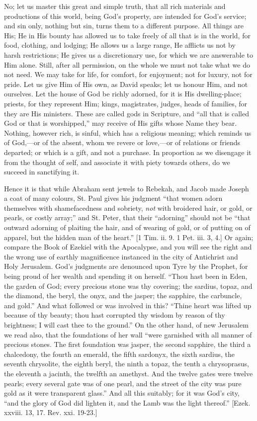 No; let us master this great and simple truth, that all rich
materials and productions of this world, being God's property, are
intended for God's service; and sin only, nothing but sin, turns them
to a different purpose. All things are His; He in His bounty has
allowed us to take freely of all that is in the world, for food,
clothing, and lodging; He allows us a large range, He afflicts us not
by harsh restrictions; He gives us a discretionary use, for which we
are answerable to Him alone. Still, after all permission, on the whole
we must not take what we do not need. We may take for life, for
comfort, for enjoyment; not for luxury, not for pride. Let us give Him
of His own, as David speaks; let us honour Him, and not ourselves. Let
the house of God be richly adorned, for it is His dwelling-place;
priests, for they represent Him; kings, magistrates, judges, heads of
families, for they are His ministers. These are called gods in
Scripture, and ``all that is called God or that is
worshipped,'' may receive of His gifts whose Name they bear.
Nothing, however rich, is sinful, which has a religious meaning; which
reminds us of God,—or of the absent, whom we revere or love,—or of
relations or friends departed; or which is a gift, and not a purchase.
In proportion as we disengage it from the thought of self, and
associate it with piety towards others, do we succeed in sanctifying
it.

Hence it is that while Abraham sent jewels to Rebekah, and Jacob
made Joseph a coat of many colours, St. Paul gives his judgment
``that women adorn themselves with shamefacedness and sobriety, \emph{not}
with broidered hair, or gold, or pearls, or costly array;'' and
St. Peter, that their ``adorning'' should not be ``that
outward adorning of plaiting the hair, and of wearing of gold, or of
putting on of apparel, but the hidden man of the heart.'' [1 Tim.
ii. 9. 1 Pet. iii. 3, 4.] Or again; compare the Book of Ezekiel with
the Apocalypse, and you will see the right and the wrong use of
earthly magnificence instanced in the city of Antichrist and Holy
Jerusalem. God's judgments are denounced upon Tyre by the Prophet, for
being proud of her wealth and spending it on herself. ``Thou hast
been in Eden, the garden of God; every precious stone was thy
covering; the sardius, topaz, and the diamond, the beryl, the onyx,
and the jasper; the sapphire, the carbuncle, and gold.'' And what
followed or was involved in this? ``Thine heart was lifted up
because of thy beauty; thou hast corrupted thy wisdom by reason of thy
brightness; I will cast thee to the ground.'' On the other hand,
of new Jerusalem we read also, that the foundations of her wall
``were garnished with all manner of precious stones. The first
foundation was jasper, the second sapphire, the third a chalcedony,
the fourth an emerald, the fifth sardonyx, the sixth sardius, the
seventh chrysolite, the eighth beryl, the ninth a topaz, the tenth a
chrysoprasus, the eleventh a jacinth, the twelfth an amethyst. And the
twelve gates were twelve pearls; every several gate was of one pearl,
and the street of the city was pure gold as it were transparent
glass.'' And all this suitably; for it was God's city, ``and
the glory of God did lighten it, and the Lamb was the light
thereof.'' [Ezek. xxviii. 13, 17. Rev. xxi. 19-23.]

